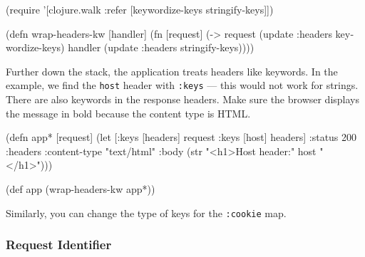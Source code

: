 \else

\begin{english}
  \begin{clojure}
(require '[clojure.walk :refer
           [keywordize-keys stringify-keys]])

(defn wrap-headers-kw [handler]
  (fn [request]
    (-> request
        (update :headers keywordize-keys)
        handler
        (update :headers stringify-keys))))
  \end{clojure}
\end{english}

\fi

Further down the stack, the application treats headers like keywords. In the example, we find the \verb|host| header with \verb|:keys| — this would not work for strings. There are also keywords in the response headers. Make sure the browser displays the message in bold because the content type is HTML.

\ifx\DEVICETYPE\MOBILE

\begin{english}
  \begin{clojure}
(defn app* [request]
  (let [{:keys [headers]} request
        {:keys [host]} headers]
    {:status 200
     :headers {:content-type "text/html"}
     :body (str "<h1>Host header:" host
                "</h1>")}))

(def app (wrap-headers-kw app*))
  \end{clojure}
\end{english}

\else

\begin{english}
\end{english}

\fi

Similarly, you can change the type of keys for the \verb|:cookie| map.

\subsubsection*{Request Identifier}


